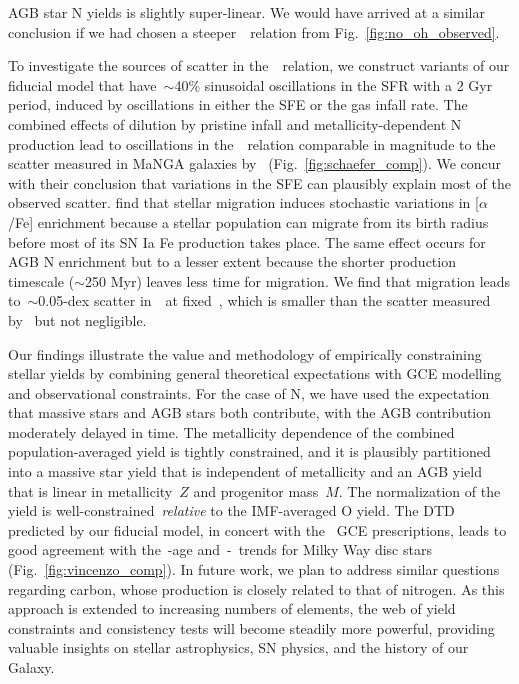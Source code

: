 \documentclass[ms.tex]{subfiles}
\begin{document}
AGB star N yields is slightly super-linear.
We would have arrived at a similar conclusion if we had chosen a
steeper~\ohno~relation from Fig.~\ref{fig:no_oh_observed}.
\par
To investigate the sources of scatter in the~\ohno~relation, we construct
variants of our fiducial model that have~$\sim$40\% sinusoidal oscillations in
the SFR with a 2 Gyr period, induced by oscillations in either the SFE or the
gas infall rate.
The combined effects of dilution by pristine infall and metallicity-dependent N
production lead to oscillations in the~\ohno~relation comparable in magnitude
to the scatter measured in MaNGA galaxies by~\citet{Schaefer2020}
(Fig.~\ref{fig:schaefer_comp}).
We concur with their conclusion that variations in the SFE can plausibly
explain most of the observed scatter.
\citet{Johnson2021} find that stellar migration induces stochastic variations
in [$\alpha$/Fe] enrichment because a stellar population can migrate from its
birth radius before most of its SN Ia Fe production takes place.
The same effect occurs for AGB N enrichment but to a lesser extent because the
shorter production timescale ($\sim$250 Myr) leaves less time for migration.
We find that migration leads to~$\sim$0.05-dex scatter in~\no~at fixed~\oh,
which is smaller than the scatter measured by~\citet{Schaefer2020} but not
negligible.
\par
Our findings illustrate the value and methodology of empirically constraining
stellar yields by combining general theoretical expectations with GCE modelling
and observational constraints.
For the case of N, we have used the expectation that massive stars and AGB stars
both contribute, with the AGB contribution moderately delayed in time.
The metallicity dependence of the combined population-averaged yield is tightly
constrained, and it is plausibly partitioned into a massive star yield that is
independent of metallicity and an AGB yield that is linear in metallicity~$Z$
and progenitor mass~$M$.
The normalization of the yield is well-constrained~\textit{relative} to the
IMF-averaged O yield.
The DTD predicted by our fiducial model, in concert with the~\citet{Johnson2021}
GCE prescriptions, leads to good agreement with the~\no-age and~\no-\ofe~trends
for Milky Way disc stars (Fig.~\ref{fig:vincenzo_comp}).
In future work, we plan to address similar questions regarding carbon, whose
production is closely related to that of nitrogen.
As this approach is extended to increasing numbers of elements, the web of
yield constraints and consistency tests will become steadily more powerful,
providing valuable insights on stellar astrophysics, SN physics, and the
history of our Galaxy.
\end{document}

